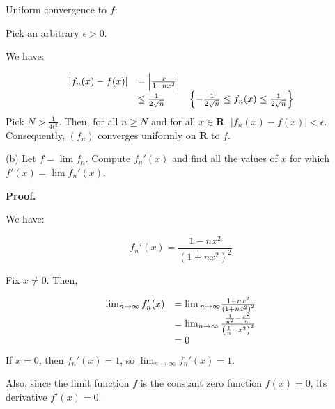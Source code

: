 \documentclass[10pt]{article}
\begin{document}
Uniform convergence to $\displaystyle f$:



Pick an arbitrary $\displaystyle \epsilon  >0$. 



We have:


\begin{equation*}
\begin{array}{ c l c }
|f_{n}( x) -f( x) | & =\left| \frac{x}{1+nx^{2}}\right|  & \\
 & \leq \frac{1}{2\sqrt{n}} & \left\{-\frac{1}{2\sqrt{n}} \leq f_{n}( x) \leq \frac{1}{2\sqrt{n}}\right\}
\end{array}
\end{equation*}
Pick $\displaystyle N >\frac{1}{4\epsilon ^{2}}$. Then, for all $\displaystyle n\geq N$ and for all $\displaystyle x\in \mathbf{R}$, $\displaystyle |f_{n}( x) -f( x) |< \epsilon $. Consequently, $\displaystyle ( f_{n})$ converges uniformly on $\displaystyle \mathbf{R}$ to $\displaystyle f$.



(b) Let $\displaystyle f=\lim f_{n}$. Compute $\displaystyle f_{n} '( x)$ and find all the values of $\displaystyle x$ for which $\displaystyle f'( x) =\lim f_{n} '( x)$.



\textbf{Proof.}



We have:


\begin{equation*}
f_{n} '( x) =\frac{1-nx^{2}}{\left( 1+nx^{2}\right)^{2}}
\end{equation*}


Fix $\displaystyle x\neq 0$. Then, 


\begin{equation*}
\begin{array}{ c l }
\lim _{n\rightarrow \infty } f_{n} '( x) & =\lim{}_{n\rightarrow \infty }\frac{1-nx^{2}}{\left( 1+nx^{2}\right)^{2}}\\
 & =\lim _{n\rightarrow \infty }\frac{\frac{1}{n^{2}} -\frac{x^{2}}{n}}{\left(\frac{1}{n} +x^{2}\right)^{2}}\\
 & =0
\end{array}
\end{equation*}
If $\displaystyle x=0$, then $\displaystyle f_{n} '( x) =1$, so $\displaystyle \lim _{n\rightarrow \infty } f_{n} '( x) =1$. 



Also, since the limit function $\displaystyle f$ is the constant zero function $\displaystyle f( x) =0$, its derivative $\displaystyle f'( x) =0$. 
\end{document}
